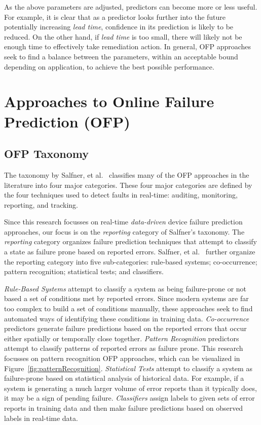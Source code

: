 As the above parameters are adjusted, predictors can become more or less
useful.  For example, it is clear that as a predictor looks further into the
future potentially increasing \emph{lead time}, confidence in its prediction is
likely to be reduced.  On the other hand, if \emph{lead time} is too small,
there will likely not be enough time to effectively take remediation action.
In general, OFP approaches seek to find a balance between the parameters,
within an acceptable bound depending on application, to achieve the best
possible performance.

\section{Approaches to Online Failure Prediction (OFP)} \label{approaches}
\subsection{OFP Taxonomy}
The taxonomy by Salfner, et al.~\cite{salfnerSurvey} classifies many of the OFP
approaches in the literature into four major categories.  These four major
categories are defined by the four techniques used to detect faults in
real-time: auditing, monitoring, reporting, and tracking.

Since this research focusses on real-time \emph{data-driven} device failure
prediction approaches, our focus is on the \emph{reporting} category of
Salfner's taxonomy.  The \emph{reporting} category organizes failure prediction
techniques that attempt to classify a state as failure prone based on reported
errors.  Salfner, et al.~\cite{salfnerSurvey} further organize the reporting
category into five sub-categories: rule-based systems; co-occurrence; pattern
recognition; statistical tests; and classifiers.

\emph{Rule-Based Systems} attempt to classify a system as being failure-prone
or not based a set of conditions met by reported errors.  Since modern systems
are far too complex to build a set of conditions manually, these approaches
seek to find automated ways of identifying these conditions in training data.
\emph{Co-occurrence} predictors generate failure predictions based on the
reported errors that occur either spatially or temporally close together.
\emph{Pattern Recognition} predictors attempt to classify patterns of reported
errors as failure prone.  This research focusses on pattern recognition OFP
approaches, which can be visualized in Figure~\ref{fig:patternRecognition}.
\emph{Statistical Tests} attempt to classify a system as failure-prone based on
statistical analysis of historical data.  For example, if a system is
generating a much larger volume of error reports than it typically does, it may
be a sign of pending failure.  \emph{Classifiers} assign labels to given sets
of error reports in training data and then make failure predictions based on
observed labels in real-time data.

